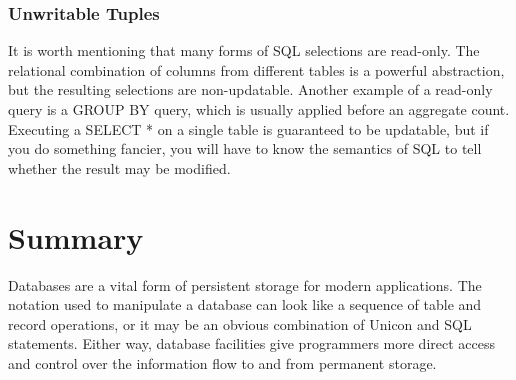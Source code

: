 \subsubsection{Unwritable Tuples}

It is worth mentioning that many forms of SQL selections are read-only.
The relational combination of columns from different tables is a
powerful abstraction, but the resulting selections are non-updatable.
Another example of a read-only query is a \textsf{GROUP BY} query,
which is usually applied before an aggregate count. Executing a
\textsf{SELECT *} on a single table is guaranteed to be updatable, but
if you do something fancier, you will have to know the semantics of SQL
to tell whether the result may be modified.

\section*{Summary}

Databases are a vital form of persistent storage for modern
applications. The notation used to manipulate a database can look like
a sequence of table and record operations, or it may be an obvious
combination of Unicon and SQL statements. Either way, database
facilities give programmers more direct access and control over the
information flow to and from permanent storage.


\bigskip


